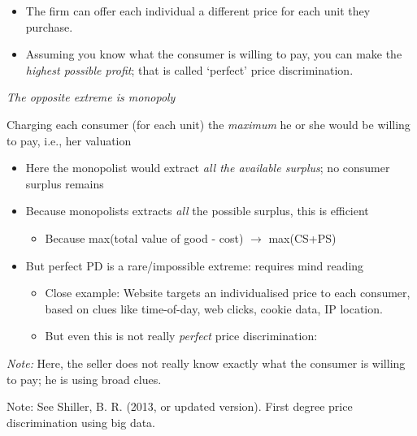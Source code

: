 \documentclass[]{article}
\providecommand{\tightlist}{%
  \setlength{\itemsep}{0pt}\setlength{\parskip}{0pt}}
\begin{document}
\begin{itemize}
\item
  The firm can offer each individual a different price for each unit
  they purchase.
\item
  Assuming you know what the consumer is willing to pay, you can make
  the \emph{highest possible profit}; that is called `perfect' price
  discrimination.
\end{itemize}

\bigskip

\emph{The opposite extreme is monopoly}

\begin{description}
\tightlist
\item[Perfect price discrimination]
Charging each consumer (for each unit) the \emph{maximum} he or she
would be willing to pay, i.e., her valuation
\end{description}

\bigskip

\begin{itemize}
\tightlist
\item
  Here the monopolist would extract \emph{all the available surplus}; no
  consumer surplus remains
\item
  Because monopolists extracts \emph{all} the possible surplus, this is
  efficient

  \begin{itemize}
  \tightlist
  \item
    Because max(total value of good - cost) \(\rightarrow\) max(CS+PS)
  \end{itemize}
\item
  But perfect PD is a rare/impossible extreme: requires mind reading

  \begin{itemize}
  \tightlist
  \item
    Close example: Website targets an individualised price to each
    consumer, based on clues like time-of-day, web clicks, cookie data,
    IP location.
  \item
    But even this is not really \emph{perfect} price discrimination:
  \end{itemize}
\end{itemize}

\emph{Note:} Here, the seller does not really know exactly what the
consumer is willing to pay; he is using broad clues.

Note: See Shiller, B. R. (2013, or updated version). First degree price
discrimination using big data.
\end{document}
